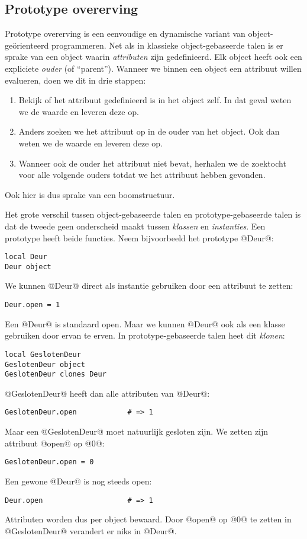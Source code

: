 
\subsection{Prototype overerving}

Prototype overerving is een eenvoudige en dynamische variant van object-geörienteerd programmeren. Net als in klassieke object-gebaseerde talen is er sprake van een object waarin \emph{attributen} zijn gedefinieerd. Elk object heeft ook een expliciete \emph{ouder} (of \enquote{parent}). Wanneer we binnen een object een attribuut willen evalueren, doen we dit in drie stappen:
\begin{enumerate}
  \item Bekijk of het attribuut gedefinieerd is in het object zelf. In dat geval weten we de waarde en leveren deze op.
  \item Anders zoeken we het attribuut op in de ouder van het object. Ook dan weten we de waarde en leveren deze op.
  \item Wanneer ook de ouder het attribuut niet bevat, herhalen we de zoektocht voor alle volgende ouders totdat we het attribuut hebben gevonden.
\end{enumerate}
Ook hier is dus sprake van een boomstructuur.

Het grote verschil tussen object-gebaseerde talen en prototype-gebaseerde talen is dat de tweede geen onderscheid maakt tussen \emph{klassen} en \emph{instanties}. Een prototype heeft beide functies. Neem bijvoorbeeld het prototype @Deur@:
\begin{lstlisting}[name=deuren]
local Deur
Deur object
\end{lstlisting}
We kunnen @Deur@ direct als instantie gebruiken door een attribuut te zetten:
\begin{lstlisting}[name=deuren]
Deur.open = 1
\end{lstlisting}
Een @Deur@ is standaard open. Maar we kunnen @Deur@ ook als een klasse gebruiken door ervan te erven. In prototype-gebaseerde talen heet dit \emph{klonen}:
\begin{lstlisting}[name=deuren]
local GeslotenDeur
GeslotenDeur object
GeslotenDeur clones Deur
\end{lstlisting}
@GeslotenDeur@ heeft dan alle attributen van @Deur@:
\begin{lstlisting}[name=deuren]
GeslotenDeur.open            # => 1
\end{lstlisting}
Maar een @GeslotenDeur@ moet natuurlijk gesloten zijn. We zetten zijn attribuut @open@ op @0@:
\begin{lstlisting}[name=deuren]
GeslotenDeur.open = 0
\end{lstlisting}
Een gewone @Deur@ is nog steeds open:
\begin{lstlisting}[name=deuren]
Deur.open                    # => 1
\end{lstlisting}
Attributen worden dus per object bewaard. Door @open@ op @0@ te zetten in @GeslotenDeur@ verandert er niks in @Deur@.

